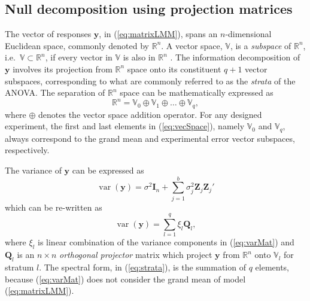 \documentclass[article]{jss}
\newcommand{\I}{\mathbf{I}}
\newcommand{\Z}{\mathbf{Z}}
\newcommand{\Q}{\mathbf{Q}}
\begin{document}
\subsection{Null decomposition using projection matrices}
\label{subsec:strataDecompProj}
The vector of responses $\bm{y}$, in (\ref{eq:matrixLMM}), spans an $n$-dimensional Euclidean space, commonly denoted by $\mathbb{R}^n$. A vector space, $\mathbb{V}$, is a \emph{subspace} of $\mathbb{R}^n$, i.e.\ $\mathbb{V} \subset \mathbb{R}^n$, if every vector in $\mathbb{V}$ is also in $\mathbb{R}^n$ \citep{Hadi1996}. The information decomposition of $\bm{y}$ involves its projection from $\mathbb{R}^n$ space onto its constituent $q + 1$ vector subspaces, corresponding to what are commonly referred to as the \emph{strata} of the ANOVA. The separation of $\mathbb{R}^n$ space can be mathematically expressed as 
\begin{equation}
\label{eq:vecSpace}
\mathbb{R}^n = \mathbb{V}_0 \oplus \mathbb{V}_1 \oplus \dots \oplus \mathbb{V}_{q},
\end{equation} 
where $\oplus$ denotes the vector space addition operator. For any designed experiment, the first and last elements in (\ref{eq:vecSpace}), namely $\mathbb{V}_0$ and $\mathbb{V}_{q}$, always correspond to the grand mean and experimental error vector subspaces, respectively. 

The variance of $\bm{y}$ can be expressed as
\begin{equation}
\label{eq:varMat}
\operatorname{var}(\bm{y}) = \sigma^2\I_n + \sum_{j=1}^{b} \sigma_j^2 \Z_j\Z_j'
\end{equation}
which can be re-written as 
\begin{equation}
\label{eq:strata}
\operatorname{var}(\bm{y}) = \sum_{l=1}^{q} \xi_l \Q_l,
\end{equation}
where $\xi_l$ is linear combination of the variance components in (\ref{eq:varMat}) and $\Q_l$ is an $n \times n$ \emph{orthogonal projector} matrix which project $\bm{y}$ from $\mathbb{R}^n$ onto  $\mathbb{V}_l$ for stratum $l$. The spectral form, in (\ref{eq:strata}), is the summation of $q$ elements, because (\ref{eq:varMat}) does not consider the grand mean of model (\ref{eq:matrixLMM}). 
\end{document}
